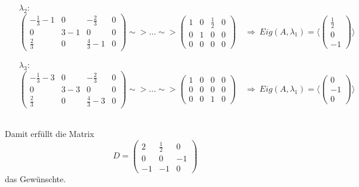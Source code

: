 \documentclass[a4paper,11pt]{scrartcl}
\begin{document}
\begin{enumerate}[a)]
\begin{itemize}
\item[$\lambda_2$:]$\left(\begin{array}{ccc|c} -\frac{1}{3}-1&0& -\frac{2}{3}&0\\ 0&3-1&0&0\\ \frac{2}{3}&0&\frac{4}{3}-1&0\end{array} \right) \sim>...\sim>\left(\begin{array}{ccc|c} 1&0&\frac{1}{2}&0\\ 0&1&0&0\\ 0&0&0&0\end{array}\right) \quad \Rightarrow \ Eig(A,\lambda_1)=\langle \begin{pmatrix}\frac{1}{2}\\0\\-1 \end{pmatrix}\rangle $
\item[$\lambda_3$:]$\left(\begin{array}{ccc|c} -\frac{1}{3}-3&0& -\frac{2}{3}&0\\ 0&3-3&0&0\\ \frac{2}{3}&0&\frac{4}{3}-3&0\end{array} \right) \sim>...\sim>\left(\begin{array}{ccc|c}1&0&0&0\\ 0&0&0&0\\ 0&0&1&0\end{array}\right) \quad \Rightarrow \  Eig(A,\lambda_1)=\langle \begin{pmatrix}0\\-1\\0 \end{pmatrix} \rangle$
\end{itemize}\quad\\
Damit erfüllt die Matrix
$$
D= \begin{pmatrix}2&\frac{1}{2}&0\\0&0&-1\\-1&-1&0 \end{pmatrix} 
$$
das Gewünschte.
\end{enumerate}
\end{document}
